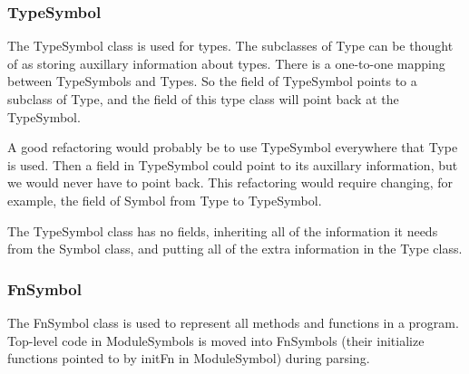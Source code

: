 \documentclass[10pt]{article}
\begin{document}
\subsubsection{TypeSymbol}
\label{sec:typesymbol}

The TypeSymbol class is used for types.  The subclasses of Type can be
thought of as storing auxillary information about types.  There is a
one-to-one mapping between TypeSymbols and Types.  So the 
field of TypeSymbol points to a subclass of Type, and the 
field of this type class will point back at the TypeSymbol.

A good refactoring would probably be to use TypeSymbol everywhere that
Type is used.  Then a field in TypeSymbol could point to its auxillary
information, but we would never have to point back.  This refactoring
would require changing, for example, the  field of Symbol
from Type to TypeSymbol.

The TypeSymbol class has no fields, inheriting all of the information
it needs from the Symbol class, and putting all of the extra
information in the Type class.

\subsubsection{FnSymbol}
\label{sec:fnsymbol}

The FnSymbol class is used to represent all methods and functions in a
program.  Top-level code in ModuleSymbols is moved into FnSymbols
(their initialize functions pointed to by initFn in ModuleSymbol)
during parsing.
\end{document}
